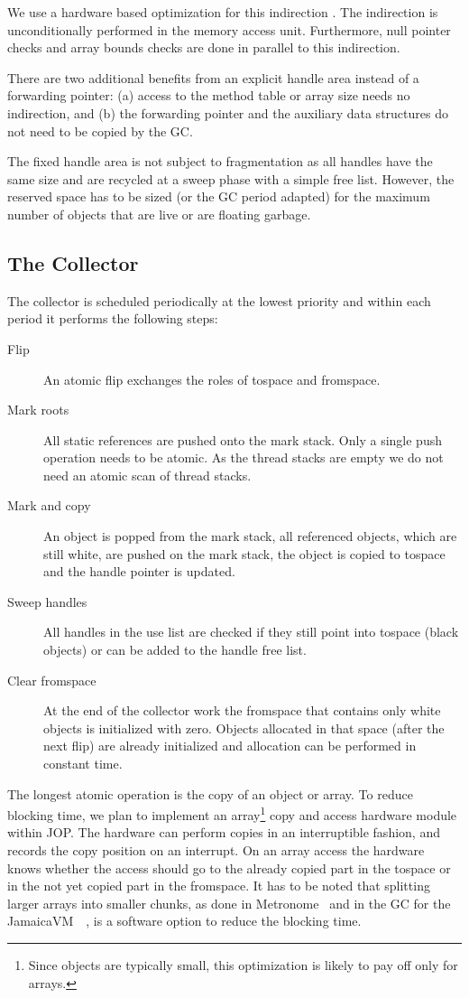 We use a hardware based optimization for this indirection
\cite{jop:oohw:jtres2007}. The indirection is unconditionally
performed in the memory access unit. Furthermore, null pointer checks
and array bounds checks are done in parallel to this indirection.

There are two additional benefits from an explicit handle area instead of a
forwarding pointer: (a) access to the method table or array size needs no
indirection, and (b) the forwarding pointer and the auxiliary data
structures do not need to be copied by the GC.

The fixed handle area is not subject to fragmentation as all handles
have the same size and are recycled at a sweep phase with a simple
free list. However, the reserved space has to be sized (or the GC
period adapted) for the maximum number of objects that are live or
are floating garbage.


\subsection{The Collector}

The collector is scheduled periodically at the lowest priority and
within each period it performs the following steps:
\begin{description}
    \item[Flip] An atomic flip exchanges the roles of tospace and
    fromspace.
    \item[Mark roots] All static references are pushed onto the mark
    stack. Only a single push operation needs to be atomic. As the
    thread stacks are empty we do not need an atomic scan of thread
    stacks.
    \item[Mark and copy] An object is popped from the mark stack,
    all referenced objects, which are still white, are pushed on the
    mark stack, the object is copied to tospace and the handle
    pointer is updated.
    \item[Sweep handles] All handles in the use list are checked if
    they still point into tospace (black objects) or can be added to
    the handle free list.
    \item[Clear fromspace] At the end of the collector work the
    fromspace that contains only white objects is initialized with
    zero. Objects allocated in that space (after the next flip) are
    already initialized and allocation can be performed in constant
    time.
\end{description}
%
The longest atomic operation is the copy of an object or array.  To
reduce blocking time, we plan to implement an array\footnote{Since
objects are typically small, this optimization is likely to pay off
only for arrays.} copy and access hardware module within JOP. The
hardware can perform copies in an interruptible fashion, and records
the copy position on an interrupt. On an array access the hardware
knows whether the access should go to the already copied part in the
tospace or in the not yet copied part in the fromspace. It has to be
noted that splitting larger arrays into smaller chunks, as done in
Metronome~\cite{gc:bacon03} and in the GC for the
JamaicaVM~~\cite{gc:siebert:phd}, is a software option to reduce the
blocking time.

